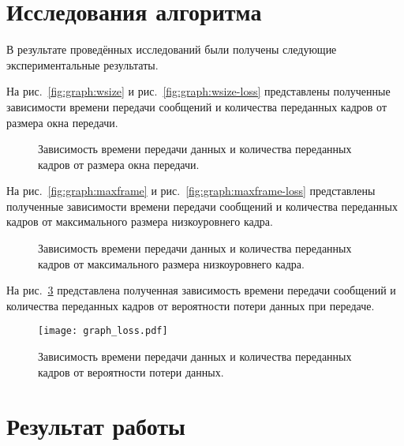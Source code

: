 \documentclass[a4paper,10pt]{article}
\begin{document}
\section{Исследования алгоритма}
В результате проведённых исследований были получены следующие экспериментальные результаты.

На рис.~\ref{fig:graph:wsize} и рис.~\ref{fig:graph:wsize-loss}
представлены полученные зависимости времени передачи сообщений 
и количества переданных кадров от размера окна передачи.
\begin{figure}
  \centering
  \quad
  \caption{Зависимость времени передачи данных и количества переданных кадров от размера окна передачи.}
  \label{fig:graph:wsize-all}
\end{figure}

На рис.~\ref{fig:graph:maxframe} и рис.~\ref{fig:graph:maxframe-loss}
представлены полученные зависимости времени передачи сообщений 
и количества переданных кадров от максимального размера низкоуровнего кадра.
\begin{figure}
  \centering
  \quad
  \caption{Зависимость времени передачи данных и количества переданных кадров 
  от максимального размера низкоуровнего кадра.}
  \label{fig:graph:maxframe-all}
\end{figure}

На рис.~\ref{fig:graph:loss}
представлена полученная зависимость времени передачи сообщений 
и количества переданных кадров от вероятности потери данных при передаче.
\begin{figure}
  \centering
  \texttt{[image: graph\_loss.pdf]}
  \caption{Зависимость времени передачи данных и количества переданных кадров 
  от вероятности потери данных.}
  \label{fig:graph:loss}
\end{figure}

\section{Результат работы}

\pagebreak
\end{document}
